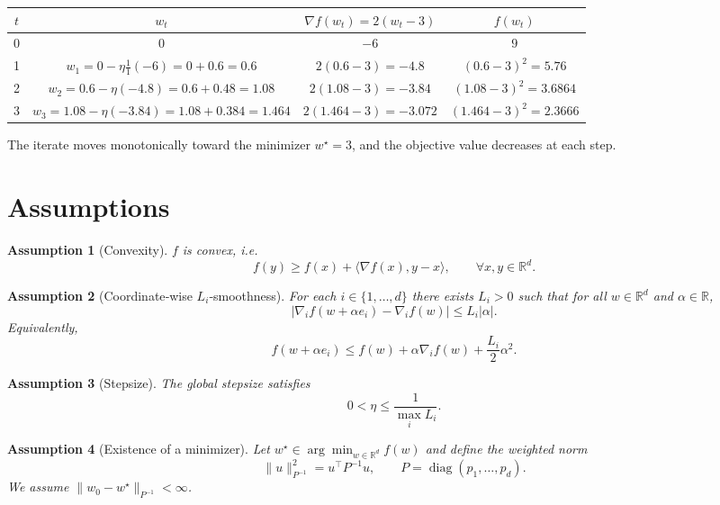 \documentclass{article}
\newtheorem{assumption}{Assumption}
\newcommand{\R}{\mathbb{R}}
\newcommand{\diag}{\operatorname{diag}}
\begin{document}
\begin{center}
\begin{tabular}{c|c|c|c}
$t$ & $w_t$ & $\nabla f(w_t)=2(w_t-3)$ & $f(w_t)$\\\hline
0 & $0$ & $-6$ & $9$\\
1 & $w_1 = 0-\eta\frac{1}{1}(-6)=0+0.6=0.6$ &
$2(0.6-3)=-4.8$ & $(0.6-3)^2=5.76$\\
2 & $w_2 = 0.6-\eta(-4.8)=0.6+0.48=1.08$ &
$2(1.08-3)=-3.84$ & $(1.08-3)^2=3.6864$\\
3 & $w_3 = 1.08-\eta(-3.84)=1.08+0.384=1.464$ &
$2(1.464-3)=-3.072$ & $(1.464-3)^2=2.3666$\\
\end{tabular}
\end{center}
The iterate moves monotonically toward the minimizer $w^\star=3$, and the
objective value decreases at each step.

\section*{Assumptions}

\begin{assumption}[Convexity]\label{ass:convex}
$f$ is convex, i.e.
\[
f(y)\ge f(x)+\langle\nabla f(x),y-x\rangle,\qquad\forall x,y\in\R^{d}.
\]
\end{assumption}

\begin{assumption}[Coordinate‑wise $L_i$‑smoothness]\label{ass:smooth}
For each $i\in\{1,\dots,d\}$ there exists $L_i>0$ such that for all
$w\in\R^{d}$ and $\alpha\in\R$,
\[
\bigl|\nabla_i f(w+\alpha e_i)-\nabla_i f(w)\bigr|\le L_i|\alpha|.
\tag{3}
\]
Equivalently,
\[
f(w+\alpha e_i)\le f(w)+\alpha\nabla_i f(w)+\frac{L_i}{2}\alpha^{2}.
\tag{4}
\]
\end{assumption}

\begin{assumption}[Stepsize]\label{ass:stepsize}
The global stepsize satisfies
\[
0<\eta\le \frac{1}{\max_{i}L_i}.
\tag{5}
\]
\end{assumption}

\begin{assumption}[Existence of a minimizer]\label{ass:opt}
Let $w^\star\in\arg\min_{w\in\R^{d}}f(w)$ and define the weighted norm
\[
\|u\|_{P^{-1}}^{2}=u^{\top}P^{-1}u,\qquad 
P=\diag(p_{1},\dots,p_{d}).
\tag{6}
\]
We assume $\|w_{0}-w^\star\|_{P^{-1}}<\infty$.
\end{assumption}
\end{document}
